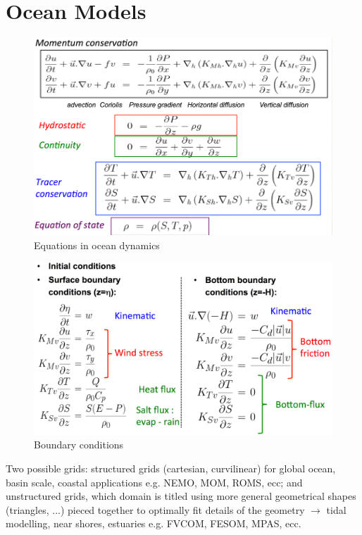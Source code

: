 
\section{Ocean Models}
\begin{figure}[h!]
	\centering
	\includegraphics[width=0.5\linewidth]{uploads/Screenshot 2024-11-21 225126.png}
	\caption{Equations in ocean dynamics}
	\label{fig:equations in ocean dyn}
\end{figure}
\begin{figure}[h!]
	\centering
	\includegraphics[width=0.5\linewidth]{uploads/Screenshot 2024-11-21 225410.png}
	\caption{Boundary conditions}
	\label{fig:boundary conditions}
\end{figure}
Two possible grids: structured grids (cartesian, curvilinear) for global ocean, basin scale, coastal applications e.g. NEMO, MOM, ROMS, ecc; and unstructured grids, which domain is titled using more general geometrical shapes (triangles, ...) pieced together to optimally fit details of the geometry $\rightarrow$ tidal modelling, near shores, estuaries e.g. FVCOM, FESOM, MPAS, ecc.
